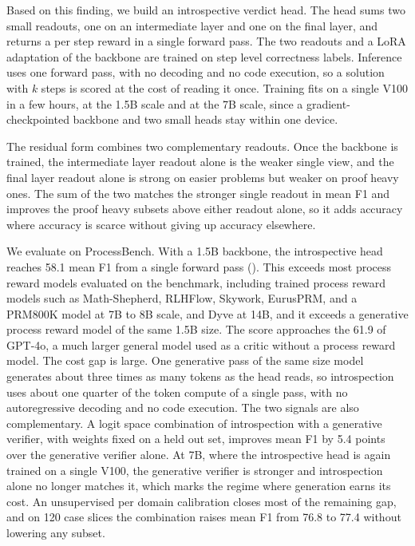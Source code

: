 Based on this finding, we build an introspective verdict head. The head sums two small readouts, one on an intermediate layer and one on the final layer, and returns a per step reward in a single forward pass. The two readouts and a LoRA adaptation of the backbone are trained on step level correctness labels. Inference uses one forward pass, with no decoding and no code execution, so a solution with $k$ steps is scored at the cost of reading it once. Training fits on a single V100 in a few hours, at the 1.5B scale and at the 7B scale, since a gradient-checkpointed backbone and two small heads stay within one device.

The residual form combines two complementary readouts. Once the backbone is trained, the intermediate layer readout alone is the weaker single view, and the final layer readout alone is strong on easier problems but weaker on proof heavy ones. The sum of the two matches the stronger single readout in mean F1 and improves the proof heavy subsets above either readout alone, so it adds accuracy where accuracy is scarce without giving up accuracy elsewhere.

We evaluate on ProcessBench. With a 1.5B backbone, the introspective head reaches 58.1 mean F1 from a single forward pass (). This exceeds most process reward models evaluated on the benchmark, including trained process reward models such as Math-Shepherd, RLHFlow, Skywork, EurusPRM, and a PRM800K model at 7B to 8B scale, and Dyve at 14B, and it exceeds a generative process reward model of the same 1.5B size. The score approaches the 61.9 of GPT-4o, a much larger general model used as a critic without a process reward model. The cost gap is large. One generative pass of the same size model generates about three times as many tokens as the head reads, so introspection uses about one quarter of the token compute of a single pass, with no autoregressive decoding and no code execution. The two signals are also complementary. A logit space combination of introspection with a generative verifier, with weights fixed on a held out set, improves mean F1 by 5.4 points over the generative verifier alone. At 7B, where the introspective head is again trained on a single V100, the generative verifier is stronger and introspection alone no longer matches it, which marks the regime where generation earns its cost. An unsupervised per domain calibration closes most of the remaining gap, and on 120 case slices the combination raises mean F1 from 76.8 to 77.4 without lowering any subset.

